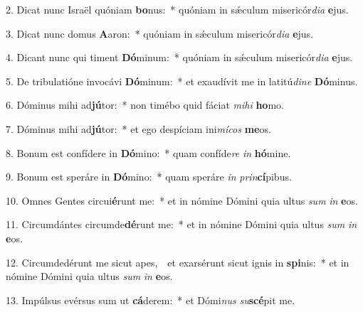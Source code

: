 
2. Dicat nunc Israël quóniam \textbf{bo}nus:~* quóniam in s\'{\ae}culum misericór\textit{di}\textit{a} \textbf{e}jus.

3. Dicat nunc domus \textbf{A}aron:~* quóniam in s\'{\ae}culum misericór\textit{di}\textit{a} \textbf{e}jus.

4. Dicant nunc qui timent \textbf{Dó}minum:~* quóniam in s\'{\ae}culum misericór\textit{di}\textit{a} \textbf{e}jus.

5. De tribulatióne invocávi \textbf{Dó}minum:~* et exaudívit me in latitú\textit{di}\textit{ne} \textbf{Dó}minus.

6. Dóminus mihi ad\textbf{jú}tor:~* non timébo quid fáciat \textit{mi}\textit{hi} \textbf{ho}mo.

7. Dóminus mihi ad\textbf{jú}tor:~* et ego despíciam ini\textit{mí}\textit{cos} \textbf{me}os.

8. Bonum est confídere in \textbf{Dó}mino:~* quam confíde\textit{re} \textit{in} \textbf{hó}mine.

9. Bonum est speráre in \textbf{Dó}mino:~* quam speráre \textit{in} \textit{prin}\textbf{cí}pibus.

10. Omnes Gentes circui\textbf{é}runt me:~* et in nómine Dómini quia ultus \textit{sum} \textit{in} \textbf{e}os.

11. Circumdántes circumde\textbf{dé}runt me:~* et in nómine Dómini quia ultus \textit{sum} \textit{in} \textbf{e}os.

12. Circumdedérunt me sicut apes,~\GreDagger\ et exarsérunt sicut ignis in \textbf{spi}nis:~* et in nómine Dómini quia ultus \textit{sum} \textit{in} \textbf{e}os.

13. Impúlsus evérsus sum ut \textbf{cá}derem:~* et Dómi\textit{nus} \textit{su}\textbf{scé}pit me.

